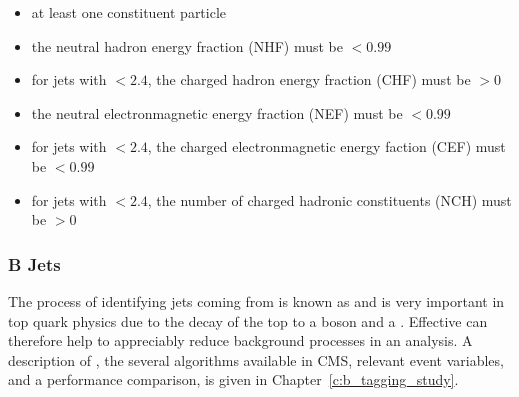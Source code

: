 \begin{itemize}
  \item at least one constituent particle
  \item the neutral hadron energy fraction (NHF) must be $<0.99$
  \item for jets with \abseta$<2.4$, the charged hadron energy fraction (CHF) must be $>0$
  \item the neutral electronmagnetic energy fraction (NEF) must be $<0.99$
  \item for jets with \abseta$<2.4$, the charged electronmagnetic energy faction (CEF) must be $<0.99$
  \item for jets with \abseta$<2.4$, the number of charged hadronic constituents (NCH) must be $>0$
\end{itemize}

\subsubsection{B Jets}
\label{sss:b_jets}
The process of identifying jets coming from \bquarks is known as \btagging and is very important in top quark
physics due to the decay of the top to a \W boson and a \bquark. Effective \btagging can therefore help to
appreciably reduce background processes in an analysis. A description of \btagging, the several algorithms
available in CMS, relevant event variables, and a performance comparison, is given in
Chapter~\ref{c:b_tagging_study}.
